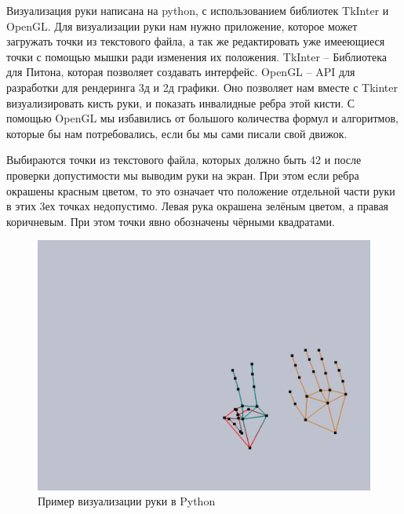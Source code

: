\hspace{0.6cm} Визуализация руки написана на python, с использованием библиотек TkInter и OpenGL. Для визуализации руки нам нужно приложение, которое может загружать точки из текстового файла, а так же редактировать уже имееющиеся точки с помощью мышки ради изменения их положения.
\hspace{0.6cm} TkInter – Библиотека для Питона, которая позволяет создавать интерфейс.
\hspace{0.6cm} OpenGL – API для разработки для рендеринга 3д и 2д графики. Оно позволяет нам вместе с Tkinter визуализировать кисть руки, и показать инвалидные ребра этой кисти. С помощью OpenGL мы избавились от большого количества формул и алгоритмов, которые бы нам потребовались, если бы мы сами писали свой движок.

\hspace{0.6cm} Выбираются точки из текстового файла, которых должно быть 42 и после проверки допустимости мы выводим руки на экран. При этом если ребра окрашены красным цветом, то это означает что положение отдельной части руки в этих 3ех точках недопустимо.
\hspace{0.6cm} Левая рука окрашена зелёным цветом, а правая коричневым. При этом точки явно обозначены чёрными квадратами.
	
\begin{figure}[ht!]
	\centering
	\includegraphics[scale=0.5]{example.png}
	\caption{Пример визуализации руки в Python}
	\label{fig:VisHand}
\end{figure}